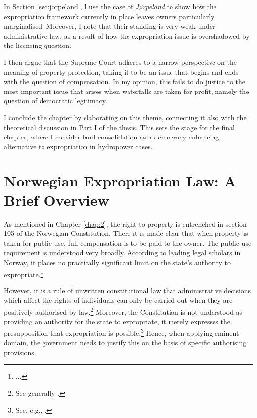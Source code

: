 In Section \ref{sec:jorpeland}, I use the case of {\it Jørpeland} to show how the expropriation framework currently in place leaves owners particularly marginalised. Moreover, I note that their standing is very weak under administrative law, as a result of how the expropriation issue is overshadowed by the licensing question.

I then argue that the Supreme Court adheres to a narrow perspective on the meaning of property protection, taking it to be an issue that begins and ends with the question of compensation. In my opinion, this fails to do justice to the most important issue that arises when waterfalls are taken for profit, namely the question of democratic legitimacy. 

I conclude the chapter by elaborating on this theme, connecting it also with the theoretical discussion in Part I of the thesis. This sets the stage for the final chapter, where I consider land consolidation as a democracy-enhancing alternative to expropriation in hydropower cases.


\section{Norwegian Expropriation Law: A Brief Overview}\label{sec:explaw}

As mentioned in Chapter \ref{chap:2}, the right to property is entrenched in section 105 of the Norwegian Constitution. There it is made clear that when property is taken for public use, full compensation is to be paid to the owner. The public use requirement is understood very broadly. According to leading legal scholars in Norway, it places no practically significant limit on the state's authority to expropriate.\footnote{...}

However, it is a rule of unwritten constitutional law that administrative decisions which affect the rights of individuals can only be carried out when they are positively authorised by law.\footnote{See generally \cite{hogberg11}.} Moreover, the Constitution is not understood as providing an authority for the state to expropriate, it merely expresses the presupposition that expropriation is possible.\footnote{See, e.g., \cite[6]{fleischer86}.} Hence, when applying eminent domain, the government needs to justify this on the basis of specific authorising provisions. 

